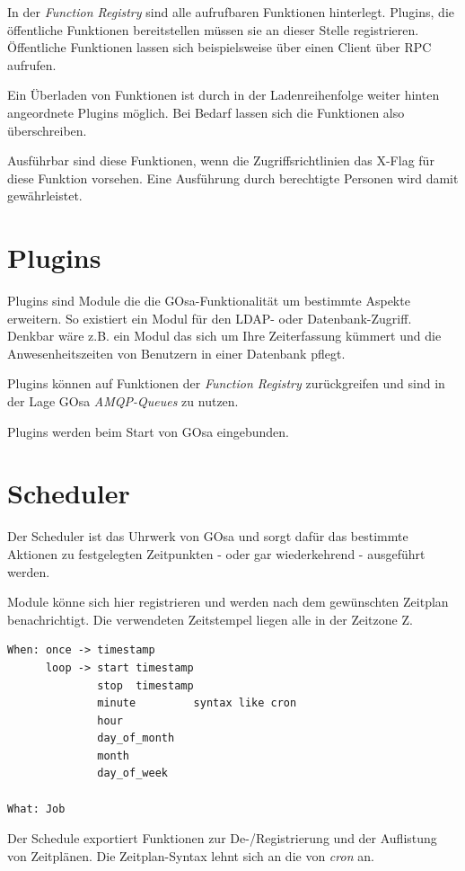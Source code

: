 In der \textit{Function Registry} sind alle aufrufbaren Funktionen hinterlegt.
Plugins, die öffentliche Funktionen bereitstellen müssen sie an dieser Stelle
registrieren. Öffentliche Funktionen lassen sich beispielsweise über einen 
Client über RPC aufrufen.

Ein Überladen von Funktionen ist durch in der Ladenreihenfolge weiter hinten
angeordnete Plugins möglich. Bei Bedarf lassen sich die Funktionen also
überschreiben.

Ausführbar sind diese Funktionen, wenn die Zugriffsrichtlinien das X-Flag 
für diese Funktion vorsehen. Eine Ausführung durch berechtigte Personen
wird damit gewährleistet.


\section{Plugins}

Plugins sind Module die die GOsa-Funktionalität um bestimmte Aspekte erweitern.
So existiert ein Modul für den LDAP- oder Datenbank-Zugriff. Denkbar wäre z.B.
ein Modul das sich um Ihre Zeiterfassung kümmert und die Anwesenheitszeiten
von Benutzern in einer Datenbank pflegt.

Plugins können auf Funktionen der \textit{Function Registry} zurückgreifen und
sind in der Lage GOsa \textit{AMQP-Queues} zu nutzen.

Plugins werden beim Start von GOsa eingebunden.


\section{Scheduler}

Der Scheduler ist das Uhrwerk von GOsa und sorgt dafür das bestimmte Aktionen
zu festgelegten Zeitpunkten - oder gar wiederkehrend - ausgeführt werden.

Module könne sich hier registrieren und werden nach dem gewünschten Zeitplan
benachrichtigt. Die verwendeten Zeitstempel liegen alle in der Zeitzone Z.

\begin{verbatim}
When: once -> timestamp
      loop -> start timestamp
              stop  timestamp
              minute         syntax like cron
              hour
              day_of_month
              month
              day_of_week

What: Job
\end{verbatim}

Der Schedule exportiert Funktionen zur De-/Registrierung und der Auflistung
von Zeit\-plä\-nen. Die Zeitplan-Syntax lehnt sich an die von \textit{cron} an.


